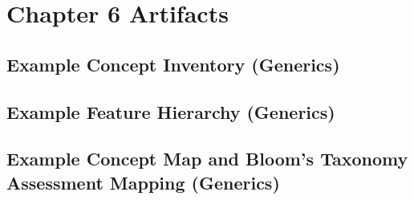 \chapter{Chapter 6 Artifacts} \label{chap6:artifacts}

\begin{appendices}

    \section{Example Concept Inventory (Generics)}
    
    
    
    \section{Example Feature Hierarchy (Generics)}
    
    
    
    \section{Example Concept Map and Bloom's Taxonomy Assessment Mapping (Generics)}
    
    
    
\end{appendices}